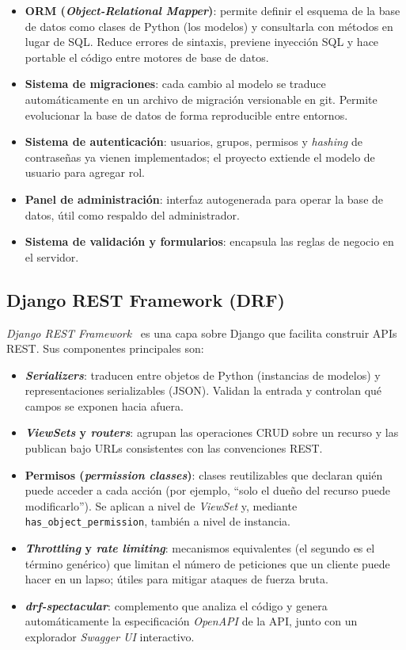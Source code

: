 \begin{itemize}
    \item \textbf{ORM (\emph{Object-Relational Mapper})}: permite definir el esquema de la base de datos como clases de Python (los modelos) y consultarla con métodos en lugar de SQL. Reduce errores de sintaxis, previene inyección SQL y hace portable el código entre motores de base de datos.
    \item \textbf{Sistema de migraciones}: cada cambio al modelo se traduce automáticamente en un archivo de migración versionable en git. Permite evolucionar la base de datos de forma reproducible entre entornos.
    \item \textbf{Sistema de autenticación}: usuarios, grupos, permisos y \emph{hashing} de contraseñas ya vienen implementados; el proyecto extiende el modelo de usuario para agregar rol.
    \item \textbf{Panel de administración}: interfaz autogenerada para operar la base de datos, útil como respaldo del administrador.
    \item \textbf{Sistema de validación y formularios}: encapsula las reglas de negocio en el servidor.
\end{itemize}

\subsection{Django REST Framework (DRF)}

\emph{Django REST Framework}~\cite{drf2024} es una capa sobre Django que facilita construir APIs REST. Sus componentes principales son:

\begin{itemize}
    \item \textbf{\emph{Serializers}}: traducen entre objetos de Python (instancias de modelos) y representaciones serializables (JSON). Validan la entrada y controlan qué campos se exponen hacia afuera.
    \item \textbf{\emph{ViewSets} y \emph{routers}}: agrupan las operaciones CRUD sobre un recurso y las publican bajo URLs consistentes con las convenciones REST.
    \item \textbf{Permisos (\emph{permission classes})}: clases reutilizables que declaran quién puede acceder a cada acción (por ejemplo, ``solo el dueño del recurso puede modificarlo''). Se aplican a nivel de \emph{ViewSet} y, mediante \texttt{has\_object\_permission}, también a nivel de instancia.
    \item \textbf{\emph{Throttling} y \emph{rate limiting}}: mecanismos equivalentes (el segundo es el término genérico) que limitan el número de peticiones que un cliente puede hacer en un lapso; útiles para mitigar ataques de fuerza bruta.
    \item \textbf{\emph{drf-spectacular}}: complemento que analiza el código y genera automáticamente la especificación \emph{OpenAPI} de la API, junto con un explorador \emph{Swagger UI} interactivo.
\end{itemize}

